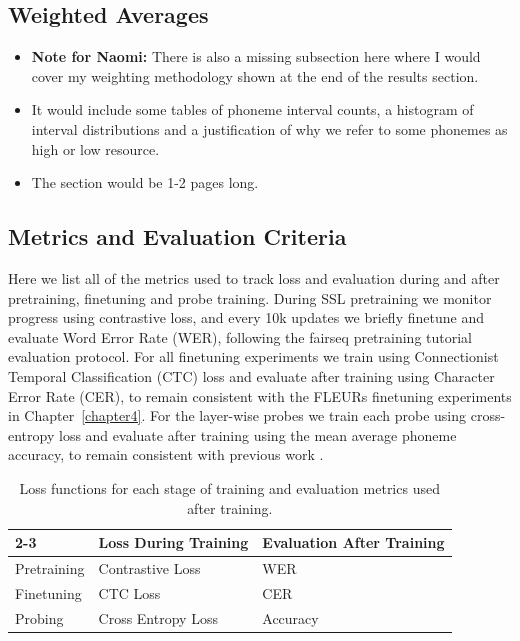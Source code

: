 \newpage
\subsection{Weighted Averages}
\begin{itemize}
    \item \textbf{Note for Naomi:} There is also a missing subsection here where I would cover my weighting methodology shown at the end of the results section.
    \item It would include some tables of phoneme interval counts, a histogram of interval distributions and a justification of why we refer to some phonemes as high or low resource.
    \item The section would be 1-2 pages long.
\end{itemize}


\newpage
\subsection{Metrics and Evaluation Criteria}\label{ed_subsec:metrics}
Here we list all of the metrics used to track loss and evaluation during and after pretraining, finetuning and probe training. During SSL pretraining we monitor progress using contrastive loss, and every 10k updates we briefly finetune and evaluate Word Error Rate (WER), following the fairseq pretraining tutorial evaluation protocol. For all finetuning experiments we train using Connectionist Temporal Classification (CTC) loss and evaluate after training using Character Error Rate (CER), to remain consistent with the FLEURs finetuning experiments in Chapter~\ref{chapter4}. For the layer-wise probes we train each probe using cross-entropy loss and evaluate after training using the mean average phoneme accuracy, to remain consistent with previous work \cite{english2022domain}.


\begin{table}[h]
\centering
\begin{tabular}{l|l|l|}
\cline{2-3}
                                  & \multicolumn{1}{c|}{Loss During Training} & \multicolumn{1}{c|}{Evaluation After Training} \\ \hline
\multicolumn{1}{|l|}{Pretraining} & Contrastive Loss                          & WER                                            \\ \hline
\multicolumn{1}{|l|}{Finetuning}  & CTC Loss                                  & CER                                            \\ \hline
\multicolumn{1}{|l|}{Probing}     & Cross Entropy Loss                        & Accuracy                                       \\ \hline
\end{tabular}
\caption{Loss functions for each stage of training and evaluation metrics used after training.}
\end{table}

